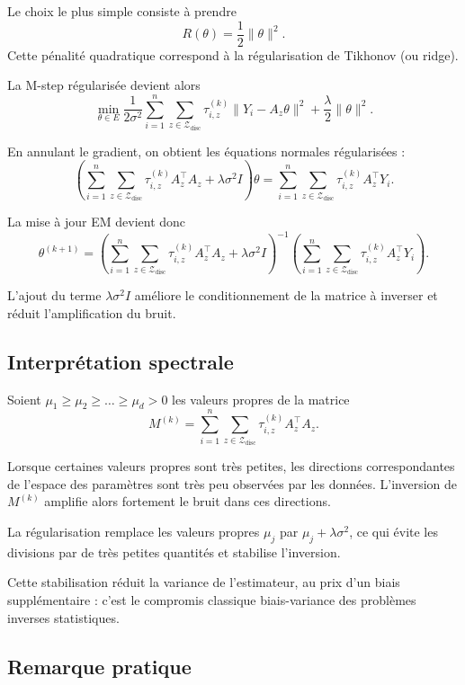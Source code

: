 \documentclass[12pt, a4paper]{article}
\theoremstyle{definition}
\begin{document}
Le choix le plus simple consiste à prendre
\[
R(\theta) = \frac12 \|\theta\|^2.
\]
Cette pénalité quadratique correspond à la régularisation de Tikhonov (ou ridge).

La M-step régularisée devient alors
\[
\min_{\theta\in E} \frac{1}{2\sigma^2} \sum_{i=1}^n \sum_{z\in\mathcal{Z}_{\text{disc}}} \tau_{i,z}^{(k)} \|Y_i - A_z\theta\|^2 + \frac{\lambda}{2}\|\theta\|^2.
\]

En annulant le gradient, on obtient les équations normales régularisées :
\[
\left( \sum_{i=1}^n \sum_{z\in\mathcal{Z}_{\text{disc}}} \tau_{i,z}^{(k)} A_z^\top A_z + \lambda\sigma^2 I \right) \theta = \sum_{i=1}^n \sum_{z\in\mathcal{Z}_{\text{disc}}} \tau_{i,z}^{(k)} A_z^\top Y_i.
\]

La mise à jour EM devient donc
\[
\theta^{(k+1)} = \left( \sum_{i=1}^n \sum_{z\in\mathcal{Z}_{\text{disc}}} \tau_{i,z}^{(k)} A_z^\top A_z + \lambda\sigma^2 I \right)^{-1} \left( \sum_{i=1}^n \sum_{z\in\mathcal{Z}_{\text{disc}}} \tau_{i,z}^{(k)} A_z^\top Y_i \right).
\]

L'ajout du terme $\lambda\sigma^2 I$ améliore le conditionnement de la matrice à inverser et réduit l'amplification du bruit.

\subsection{Interprétation spectrale}

Soient $\mu_1 \ge \mu_2 \ge \dots \ge \mu_d > 0$ les valeurs propres de la matrice
\[
M^{(k)} = \sum_{i=1}^n \sum_{z\in\mathcal{Z}_{\text{disc}}} \tau_{i,z}^{(k)} A_z^\top A_z.
\]

Lorsque certaines valeurs propres sont très petites, les directions correspondantes de l'espace des paramètres sont très peu observées par les données. L'inversion de $M^{(k)}$ amplifie alors fortement le bruit dans ces directions.

La régularisation remplace les valeurs propres $\mu_j$ par $\mu_j + \lambda\sigma^2$, ce qui évite les divisions par de très petites quantités et stabilise l'inversion.

Cette stabilisation réduit la variance de l'estimateur, au prix d'un biais supplémentaire : c'est le compromis classique biais-variance des problèmes inverses statistiques.

\subsection{Remarque pratique}
\end{document}
